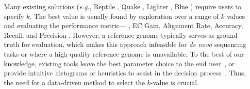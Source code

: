





Many existing solutions (\textit{e.g.}, Reptile \cite{yang2010reptile}, Quake \cite{kelley2010quake}, Lighter \cite{song2014lighter}, Blue \cite{greenfield2014blue}) require users to specify $k$. The best value is usually found by exploration over a range of $k$ values \cite{kao2011echo} and evaluating the performance metric--- \eg, EC Gain, Alignment Rate, Accuracy, Recall, and Precision \cite{heydari2017evaluation}.
However, a reference genome typically serves as ground truth for evaluation, which makes this approach infeasible for \textit{de novo} sequencing tasks or where a high-quality reference genome is unavailable. 
To the best of our knowledge, existing tools leave the best parameter choice to the end user~\cite{peng2010idba, mahadik2017scalable}, or provide intuitive histograms or heuristics to assist in the decision process~\cite{chikhi2013informed}. Thus, the need for a data-driven method to select the $k$-value is crucial.
  
